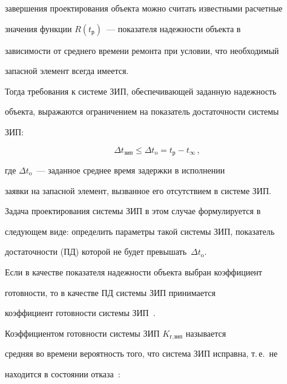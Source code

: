 завершения проектирования объекта можно считать известными расчетные 


значения функции $R(t_{\mathrm{р}})$~--- показателя надежности объекта в 


зависимости от среднего времени ремонта при условии, что необходимый 


запасной элемент всегда имеется.


     


     Тогда требования к системе ЗИП, обеспечивающей заданную надежность 


объекта, выражаются ограничением на показатель достаточности системы 


ЗИП:


     \begin{equation}


     \Delta t_{\mathrm{зип}}\leq  \Delta t_{\mathrm{o}} = t_{\mathrm{р}}- 


t_\infty\,, 


     \label{e1-koz}


     \end{equation}


где $\Delta t_{\mathrm{o}}$~--- заданное среднее время задержки в исполнении 


заявки на запасной элемент, вызванное его отсутствием в системе ЗИП.


     


     Задача проектирования системы ЗИП в этом случае формулируется в 


сле\-ду\-ющем виде: определить параметры такой системы ЗИП, показатель 


доста\-точ\-ности (ПД) которой не будет превышать~$\Delta t_{\mathrm{o}}$.


     


     Если в качестве показателя надежности объекта выбран коэффициент 


готовности, то в качестве ПД системы ЗИП принимается 


коэффициент готовности системы ЗИП~\cite{5-koz}.


     


     Коэффициентом готовности системы ЗИП $K_{\mathrm{г.зип}}$ называется 


средняя во времени вероятность того, что система ЗИП исправна, т.\,е.\ не 


находится в состоянии отказа~\cite{5-koz}:


